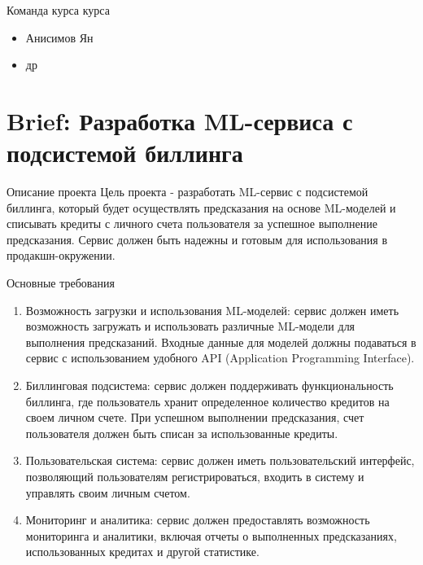\documentclass[
  ignorenonframetext,
  aspectratio=169,
  aspectratio=169]{beamer}
\providecommand{\tightlist}{%
  \setlength{\itemsep}{0pt}\setlength{\parskip}{0pt}}
\begin{document}
\begin{frame}{Команда курса курса}
\protect\hypertarget{ux43aux43eux43cux430ux43dux434ux430-ux43aux443ux440ux441ux430-ux43aux443ux440ux441ux430}{}
\begin{itemize}
\tightlist
\item
  Анисимов Ян
\item
  др
\end{itemize}
\end{frame}

\hypertarget{brief-ux440ux430ux437ux440ux430ux431ux43eux442ux43aux430-ml-ux441ux435ux440ux432ux438ux441ux430-ux441-ux43fux43eux434ux441ux438ux441ux442ux435ux43cux43eux439-ux431ux438ux43bux43bux438ux43dux433ux430}{%
\section{Brief: Разработка ML-сервиса с подсистемой
биллинга}\label{brief-ux440ux430ux437ux440ux430ux431ux43eux442ux43aux430-ml-ux441ux435ux440ux432ux438ux441ux430-ux441-ux43fux43eux434ux441ux438ux441ux442ux435ux43cux43eux439-ux431ux438ux43bux43bux438ux43dux433ux430}}

\begin{frame}{Описание проекта}
\protect\hypertarget{ux43eux43fux438ux441ux430ux43dux438ux435-ux43fux440ux43eux435ux43aux442ux430}{}
Цель проекта - разработать ML-сервис с подсистемой биллинга, который
будет осуществлять предсказания на основе ML-моделей и списывать кредиты
с личного счета пользователя за успешное выполнение предсказания. Сервис
должен быть надежны и готовым для использования в продакшн-окружении.
\end{frame}

\begin{frame}{Основные требования}
\protect\hypertarget{ux43eux441ux43dux43eux432ux43dux44bux435-ux442ux440ux435ux431ux43eux432ux430ux43dux438ux44f}{}
\begin{enumerate}
\item
  Возможность загрузки и использования ML-моделей: сервис должен иметь
  возможность загружать и использовать различные ML-модели для
  выполнения предсказаний. Входные данные для моделей должны подаваться
  в сервис с использованием удобного API (Application Programming
  Interface).
\item
  Биллинговая подсистема: сервис должен поддерживать функциональность
  биллинга, где пользователь хранит определенное количество кредитов на
  своем личном счете. При успешном выполнении предсказания, счет
  пользователя должен быть списан за использованные кредиты.
\item
  Пользовательская система: сервис должен иметь пользовательский
  интерфейс, позволяющий пользователям регистрироваться, входить в
  систему и управлять своим личным счетом.
\item
  Мониторинг и аналитика: сервис должен предоставлять возможность
  мониторинга и аналитики, включая отчеты о выполненных предсказаниях,
  использованных кредитах и другой статистике.
\end{enumerate}
\end{frame}
\end{document}
